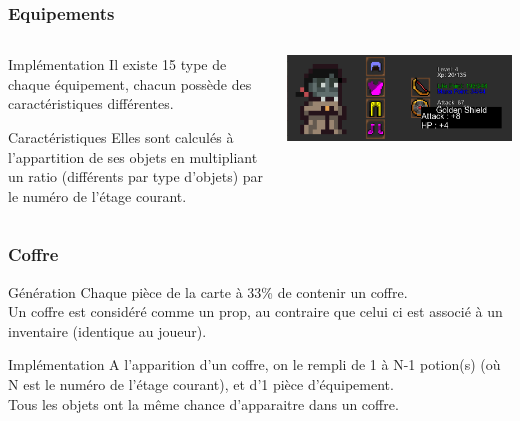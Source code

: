 \documentclass[french]{beamer}
\begin{document}
\begin{frame}
\frametitle{Equipements}

\begin{columns}
    \begin{column}{0.34\textwidth}
    
        \begin{block}{Implémentation}
        Il existe 15 type de chaque équipement, chacun possède des caractéristiques différentes.\\ 
        \end{block}
        
        \begin{block}{Caractéristiques}
            Elles sont calculés à l'appartition de ses objets en multipliant un ratio (différents par type d'objets) par le numéro de l'étage courant.
        \end{block}
    \end{column}
    \begin{column}{0.66\textwidth}
    \includegraphics[scale=0.28]{Equipements}
    \end{column}
\end{columns}
\end{frame}

\begin{frame}
\frametitle{Coffre}
\begin{block}{Génération}
Chaque pièce de la carte à 33\% de contenir un coffre.    \\
Un coffre est considéré comme un prop, au contraire que celui ci est associé à un inventaire (identique au joueur).
\end{block}

\begin{block}{Implémentation} 
A l'apparition d'un coffre, on le rempli de 1 à N-1 potion(s) (où N est le numéro de l'étage courant), et d'1 pièce d'équipement.\\
Tous les objets ont la même chance d'apparaitre dans un coffre.
\end{block}
\end{frame}
\end{document}
